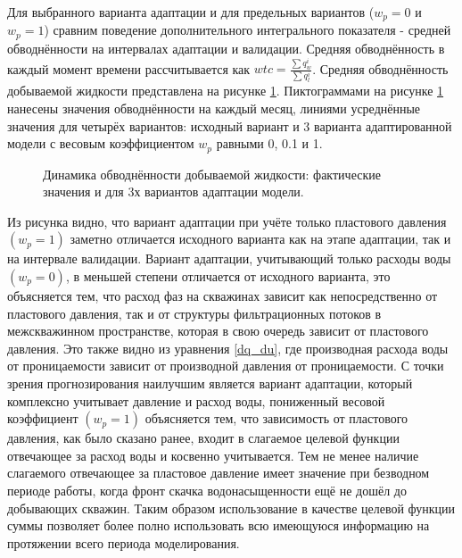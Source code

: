 \documentclass{article}
\begin{document}
Для выбранного варианта адаптации и для предельных вариантов ($w_p = 0$ и $w_p = 1$) сравним поведение дополнительного интегрального показателя - средней обводнённости на интервалах адаптации и валидации. Средняя обводнённость в каждый момент времени рассчитывается как $wtc = \frac{\sum{q_w^i}}{\sum{q_l^i}}$. Средняя обводнённость добываемой жидкости представлена на рисунке \ref{fig:wtс}. Пиктограммами на рисунке \ref{fig:wtс} нанесены значения обводнённости на каждый месяц, линиями усреднённые значения для четырёх вариантов: исходный вариант и 3 варианта адаптированной модели с весовым коэффициентом $w_p$ равными 0, 0.1 и 1. 
\begin{figure}
	\caption{Динамика обводнённости добываемой жидкости: фактические значения и для 3х вариантов адаптации модели.}
	\label{fig:wtс}
\end{figure}
Из рисунка видно, что вариант адаптации при учёте только пластового давления $(w_p=1)$ заметно отличается исходного варианта как на этапе адаптации, так и на интервале валидации. Вариант адаптации, учитывающий только расходы воды $(w_p=0)$, в меньшей степени отличается от исходного варианта, это объясняется тем, что расход фаз на скважинах зависит как непосредственно от пластового давления, так и от структуры фильтрационных потоков в межскважинном пространстве, которая в свою очередь зависит от пластового давления. Это также видно из уравнения \ref{dq_du}, где производная расхода воды от проницаемости зависит от производной давления от проницаемости. С точки зрения прогнозирования наилучшим является вариант адаптации, который комплексно учитывает давление и расход воды, пониженный весовой коэффициент $(w_p=1)$ объясняется тем, что зависимость от пластового давления, как было сказано ранее, входит в слагаемое целевой функции отвечающее за расход воды и косвенно учитывается. Тем не менее наличие слагаемого отвечающее за пластовое давление имеет значение при безводном периоде работы, когда фронт скачка водонасыщенности ещё не дошёл до добывающих скважин. Таким образом использование в качестве целевой функции суммы позволяет более полно использовать всю имеющуюся информацию на протяжении всего периода моделирования. 
\end{document}
